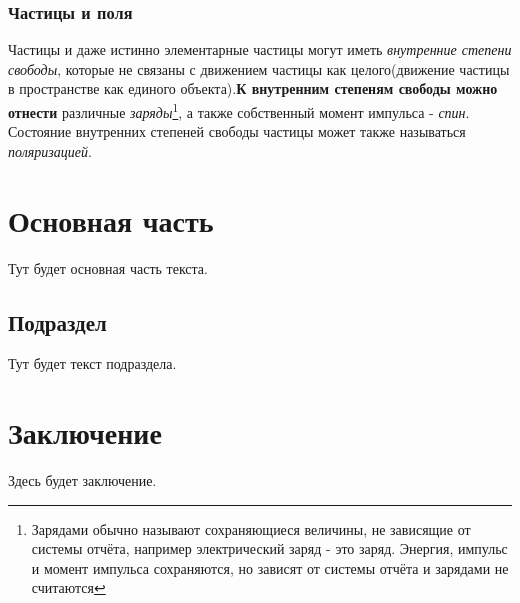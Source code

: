     \subsubsection {Частицы и поля}
    \par Частицы и даже истинно элементарные частицы могут иметь \textit{внутренние степени свободы}, которые не связаны с движением частицы как целого(движение частицы в пространстве как единого объекта).\textbf{К внутренним степеням свободы можно отнести} различные \textit{заряды}\footnote{Зарядами обычно называют сохраняющиеся величины, не зависящие от системы отчёта, например электрический заряд - это заряд. Энергия, импульс и момент импульса сохраняются, но зависят от системы отчёта и зарядами не считаются}, а также собственный момент импульса - \textit{спин}. Состояние внутренних степеней свободы частицы может также называться \textit{поляризацией}.
    
	\clearpage
	\section{Основная часть}
	Тут будет основная часть текста.
	\clearpage
	\subsection{Подраздел}
	Тут будет текст подраздела.
	\clearpage
	\section{Заключение}
	Здесь будет заключение.
	
